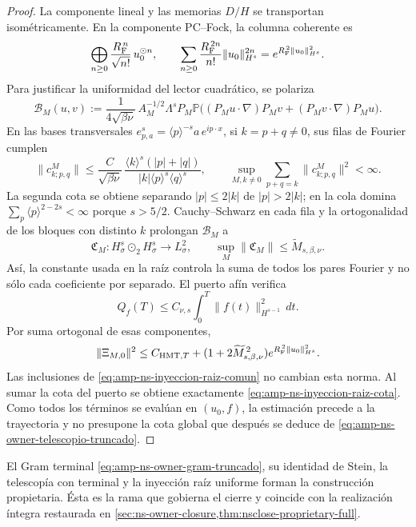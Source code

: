 \begin{proof}
La componente lineal y las memorias \(D/H\) se transportan
isométricamente. En la componente PC--Fock, la columna coherente es
\[
 \bigoplus_{n\geq0}
 \frac{R_{\rm F}^{\,n}}{\sqrt{n!}}\,u_0^{\odot n},
 \qquad
 \sum_{n\geq0}\frac{R_{\rm F}^{\,2n}}{n!}
       \|u_0\|_{H^s}^{2n}
 =e^{R_{\rm F}^{\,2}\|u_0\|_{H^s}^2}.
\]
Para justificar la uniformidad del lector cuadrático, se polariza
\begin{equation}\label{eq:amp-ns-lector-cuadratico-polarizado}
 \mathcal B_M(u,v):=
 \frac{1}{4\sqrt{\beta\nu}}\,
 A_M^{-1/2}\Lambda^sP_M\mathbb P
 \bigl((P_Mu\!\cdot\!\nabla)P_Mv
      +(P_Mv\!\cdot\!\nabla)P_Mu\bigr).
\end{equation}
En las bases transversales
\(e^s_{p,a}=\langle p\rangle^{-s}a\,e^{ip\cdot x}\), si
\(k=p+q\ne0\), sus filas de Fourier cumplen
\begin{equation}\label{eq:amp-ns-filas-fourier-uniformes}
 \|c^M_{k;p,q}\|
 \leq\frac{C}{\sqrt{\beta\nu}}\,
 \frac{\langle k\rangle^s(|p|+|q|)}
 {|k|\langle p\rangle^s\langle q\rangle^s},
 \qquad
 \sup_{M,k\ne0}\sum_{p+q=k}\|c^M_{k;p,q}\|^2<\infty .
\end{equation}
La segunda cota se obtiene separando \(|p|\leq2|k|\) de
\(|p|>2|k|\); en la cola domina
\(\sum_p\langle p\rangle^{2-2s}<\infty\) porque \(s>5/2\).
Cauchy--Schwarz en cada fila y la ortogonalidad de los bloques con distinto
\(k\) prolongan \(\mathcal B_M\) a
\[
 \mathfrak C_M:H^s_\sigma\odot_2H^s_\sigma\longrightarrow L^2_\sigma,
 \qquad
 \sup_M\|\mathfrak C_M\|
 \leq\widetilde M_{s,\beta,\nu}.
\]
Así, la constante usada en la raíz controla la suma de todos los pares
Fourier y no sólo cada coeficiente por separado. El puerto afín verifica
\[
 Q_f(T)\leq C_{\nu,s}
 \int_0^T\|f(t)\|_{H^{s-1}}^2\,dt .
\]
Por suma ortogonal de esas componentes,
\begin{equation}\label{eq:amp-ns-raiz-cota-por-componentes}
 \|\Xi_{M,0}\|^2
 \leq C_{{\rm HMT},T}
 +(1+2\widetilde M_{s,\beta,\nu}^{\,2})
 e^{R_{\rm F}^{\,2}\|u_0\|_{H^s}^2}.
\end{equation}
Las inclusiones de \eqref{eq:amp-ns-inyeccion-raiz-comun} no cambian esta
norma. Al sumar la cota del puerto se obtiene exactamente
\eqref{eq:amp-ns-inyeccion-raiz-cota}. Como todos los términos se evalúan
en \((u_0,f)\), la estimación precede a la trayectoria y no presupone la
cota global que después se deduce de
\eqref{eq:amp-ns-owner-telescopio-truncado}.
\end{proof}

El Gram terminal \eqref{eq:amp-ns-owner-gram-truncado}, su identidad de
Stein, la telescopía con terminal y la inyección raíz uniforme forman la
construcción propietaria. Ésta es la rama que gobierna el cierre y coincide
con la realización íntegra restaurada en
\cref{sec:ns-owner-closure,thm:nsclose-proprietary-full}.

